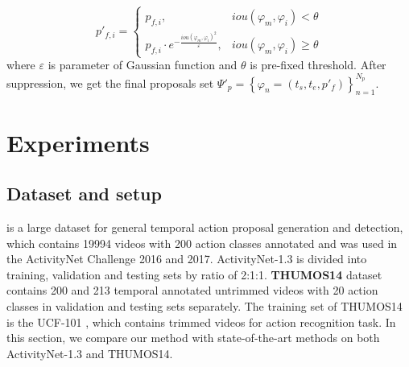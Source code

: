 \documentclass[runningheads]{llncs}
\begin{document}
\vspace{-0.05cm}
\begin{equation}
p'_{f,i}=\left\{\begin{matrix}
p_{f,i}, & iou(\varphi_m,\varphi_i)<\theta\\ 
p_{f,i}\cdot e^{-\frac{iou(\varphi_m,\varphi_i)^2}{\varepsilon }}, & iou(\varphi_m,\varphi_i)\geq \theta
\end{matrix}\right. 
\end{equation}
where $\varepsilon $ is parameter of Gaussian function and $\theta$ is pre-fixed threshold. 
After suppression, we get the final proposals set $\Psi'_p  = \left \{ \varphi  _n=(t_s,t_e,p'_f  ) \right \}_{n=1}^{N_p}$.
% 



\section{Experiments}

\subsection{Dataset and setup}
 \cite{caba2015activitynet} is a large dataset for general temporal action proposal generation and detection, which contains 19994 videos   with 200 action classes annotated and was used in the ActivityNet Challenge 2016 and 2017. ActivityNet-1.3 is divided into training, validation and testing sets by ratio of 2:1:1. 
{\bf THUMOS14} \cite{jiang2014thumos} dataset contains 200 and 213 temporal annotated untrimmed videos with 20 action classes in validation and testing sets separately. The training set of THUMOS14 is the UCF-101 \cite{soomro2012ucf101}, which contains trimmed videos for action recognition task. 
In this section, we compare our method with state-of-the-art methods on both ActivityNet-1.3 and THUMOS14.%
\end{document}
